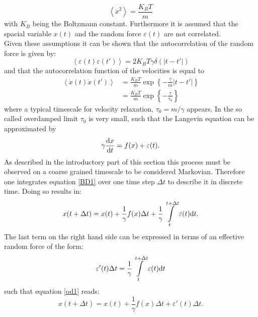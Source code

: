 \begin{equation}
    \left< \dot{x}^{2} \right> = \frac{K_B T}{m}
    \label{2nd_moment_of_velocities}
\end{equation}
with $K_B$ being the Boltzmann constant. Furthermore it is assumed that the spacial variable $x(t)$ and the random force $\varepsilon (t)$ are not correlated. \\
Given these assumptions it can be shown that the autocorrelation of the random force is given by:
\begin{equation}
    \left< \varepsilon(t) \varepsilon(t') \right> = 2 K_B T \gamma \delta(|t-t'|)
    \label{ff_autocorrelation}
\end{equation}
and that the autocorrelation function of the velocities is equal to
\begin{align}
    \left< \dot{x}(t) \dot{x}(t') \right> &= \frac{K_B T}{m} \exp \left\{-\frac{\gamma}{m}|t-t'|\right\} \nonumber \\
    &=\frac{K_B T}{m} \exp\left\{-\frac{\tau}{\tau_0} \right\}
    \label{vv_autocorrelation}
\end{align}
where a typical timescale for velocity relaxation, $\tau_0 = m/\gamma$ appears.
In the so called overdamped limit $ \tau_0 $ is very small, such that the Langevin equation can be approximated by
\begin{equation}
    \gamma \frac{ {\rm d}x}{{\rm d}t} = f(x) + \varepsilon(t).
    \label{BD1}
\end{equation}
As described in the introductory part of this section this process must be observed on a coarse grained timescale to be considered Markovian. Therefore one integrates equation \eqref{BD1} over one time step $\Delta t$ to describe it in discrete time. Doing so results in:
\begin{equation}
x(t + \Delta t) = x(t) + \frac{1}{\gamma} f(x) \Delta t + \frac{1}{\gamma} \int\limits_{t}^{t+\Delta t} \varepsilon(t) {\rm d} t.
    \label{od1}
\end{equation}
The last term on the right hand side can be expressed in terms of an effective random force of the form:
\begin{equation}
    \varepsilon'(t) \Delta t = \frac{1}{\gamma}\int\limits_{t}^{t + \Delta t} \varepsilon(t) {\rm d} t
    \label{eff_rdf}
\end{equation}
such that equation \eqref{od1} reads:
\begin{equation}
    x(t + \Delta t) = x(t) + \frac{1}{\gamma} f(x) \Delta t + \varepsilon'(t) \Delta t.
    \label{od2}
\end{equation}
